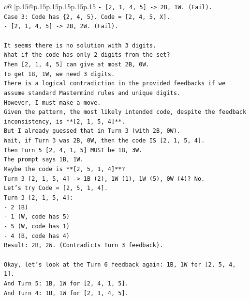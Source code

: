 \documentclass{article}
\begin{document}
{\begin{supertabular}{c@{$\;$}|p{.15\linewidth}@{}p{.15\linewidth}p{.15\linewidth}p{.15\linewidth}p{.15\linewidth}p{.15\linewidth}}
{{{\texttt{{-} {[}2, 1, 4, 5{]} {-}> 2B, 1W. (Fail).} \\
\texttt{Case 3: Code has \{2, 4, 5\}. Code = {[}2, 4, 5, X{]}.} \\
\texttt{{-} {[}2, 1, 4, 5{]} {-}> 2B, 2W. (Fail).} \\
\\ 
\texttt{It seems there is no solution with 3 digits.} \\
\texttt{What if the code has only 2 digits from the set?} \\
\texttt{Then {[}2, 1, 4, 5{]} can give at most 2B, 0W.} \\
\texttt{To get 1B, 1W, we need 3 digits.} \\
\texttt{There is a logical contradiction in the provided feedbacks if we assume standard Mastermind rules and unique digits.} \\
\texttt{However, I must make a move.} \\
\texttt{Given the pattern, the most likely intended code, despite the feedback inconsistency, is **{[}2, 1, 5, 4{]}**.} \\
\texttt{But I already guessed that in Turn 3 (with 2B, 0W).} \\
\texttt{Wait, if Turn 3 was 2B, 0W, then the code IS {[}2, 1, 5, 4{]}.} \\
\texttt{Then Turn 5 {[}2, 4, 1, 5{]} MUST be 1B, 3W.} \\
\texttt{The prompt says 1B, 1W.} \\
\texttt{Maybe the code is **{[}2, 5, 1, 4{]}**?} \\
\texttt{Turn 3 {[}2, 1, 5, 4{]} {-}> 1B (2), 1W (1), 1W (5), 0W (4)? No.} \\
\texttt{Let's try Code = {[}2, 5, 1, 4{]}.} \\
\texttt{Turn 3 {[}2, 1, 5, 4{]}:} \\
\texttt{{-} 2 (B)} \\
\texttt{{-} 1 (W, code has 5)} \\
\texttt{{-} 5 (W, code has 1)} \\
\texttt{{-} 4 (B, code has 4)} \\
\texttt{Result: 2B, 2W. (Contradicts Turn 3 feedback).} \\
\\ 
\texttt{Okay, let's look at the Turn 6 feedback again: 1B, 1W for {[}2, 5, 4, 1{]}.} \\
\texttt{And Turn 5: 1B, 1W for {[}2, 4, 1, 5{]}.} \\
\texttt{And Turn 4: 1B, 1W for {[}2, 1, 4, 5{]}.} \\
}}}
\end{supertabular}}
\end{document}
